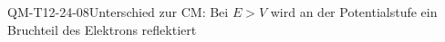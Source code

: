 
\begin{CONC}{QM-T12-24-08}{Unterschied zur CM: Bei $E>V$ wird an der Potentialstufe ein Bruchteil des Elektrons reflektiert}
\end{CONC}

